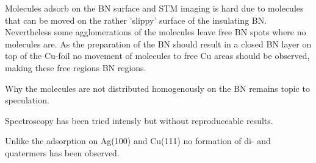 \label{sec:single-TBP-hBN}
Molecules adsorb on the BN surface and STM imaging is hard due to molecules that can be moved on the rather 'slippy' surface of the insulating BN. Nevertheless some agglomerations of the molecules leave free BN spots where no molecules are. As the preparation of the BN should result in a closed BN layer on top of the Cu-foil no movement of molecules to free Cu areas should be observed, making these free regions BN regions.

Why the molecules are not distributed homogenously on the BN remains topic to speculation.

Spectroscopy has been tried intensly but without reproduceable results.

Unlike the adsorption on Ag(100) and Cu(111) no formation of di- and quatermers has been observed.